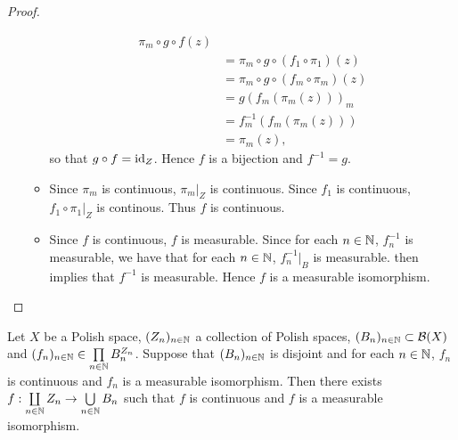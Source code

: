 \documentclass{book}
\begin{document}
\begin{proof}
\begin{enumerate}
\begin{itemize}
\begin{align*}
					\pi_m \circ g \circ f(z) \\
					& = \pi_m \circ g \circ (f_1 \circ \pi_1)(z) \\
					& = \pi_m \circ g \circ (f_m \circ \pi_m)(z) \\
					& = g(f_m ( \pi_m(z)))_m \\
					& = f_m^{-1}(f_m ( \pi_m(z))) \\
					& = \pi_m(z),
				\end{align*} 
				so that $g \circ f = \operatorname{id}_Z$. Hence $f$ is a bijection and $f^{-1} = g$. 
				\item Since $\pi_m$ is continuous, $\pi_m|_Z$ is continuous. Since $f_1$ is continuous, $f_1 \circ \pi_1|_Z$ is continous. Thus $f$ is continuous.  
				\item Since $f$ is continuous, $f$ is measurable. Since for each $n \in \mathbb{N}$, $f_n^{-1}$ is measurable, we have that for each $n \in \mathbb{N}$, $f_n^{-1}|_B$ is measurable.  then implies that $f^{-1}$ is measurable. Hence $f$ is a measurable isomorphism. 
			\end{itemize}
		\end{enumerate}
	\end{proof}

	\begin{ex} 
		Let $X$ be a Polish space, $(Z_n)_{n \in \mathbb{N}}$ a collection of Polish spaces, $(B_n)_{n \in \mathbb{N}} \subset \mathcal{B}(X)$ and $(f_n)_{n \in \mathbb{N}} \in \prod\limits_{n \in \mathbb{N}} B_n^{Z_n}$. Suppose that $(B_n)_{n \in \mathbb{N}}$ is disjoint and for each $n \in \mathbb{N}$, $f_n$ is continuous and $f_n$ is a measurable isomorphism. Then there exists $f: \coprod\limits_{n \in \mathbb{N}} Z_n \rightarrow \bigcup\limits_{n \in \mathbb{N}} B_n$ such that $f$ is continuous and $f$ is a measurable isomorphism.
	\end{ex}
\end{document}

